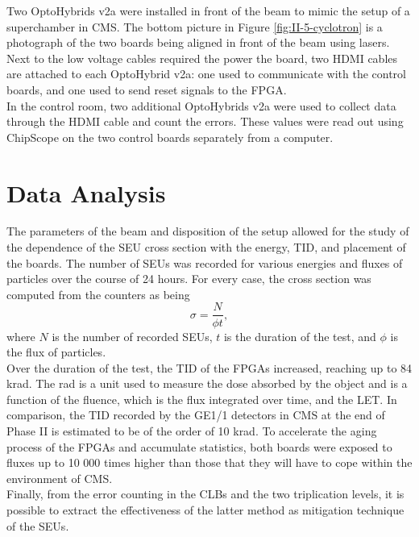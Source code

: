     Two OptoHybrids v2a were installed in front of the beam to mimic the setup of a superchamber in CMS. The bottom picture in Figure \ref{fig:II-5-cyclotron} is a photograph of the two boards being aligned in front of the beam using lasers. Next to the low voltage cables required the power the board, two HDMI cables are attached to each OptoHybrid v2a: one used to communicate with the control boards, and one used to send reset signals to the FPGA. \\

    In the control room, two additional OptoHybrids v2a were used to collect data through the HDMI cable and count the errors. These values were read out using ChipScope on the two control boards separately from a computer.

  \section{Data Analysis}

    The parameters of the beam and disposition of the setup allowed for the study of the dependence of the SEU cross section with the energy, TID, and placement of the boards. The number of SEUs was recorded for various energies and fluxes of particles over the course of 24 hours. For every case, the cross section was computed from the counters as being
    \begin{equation}
        \sigma = \frac{N}{\phi t} ,
    \end{equation}
    where $ N $ is the number of recorded SEUs, $ t $ is the duration of the test, and $ \phi $ is the flux of particles. \\

    Over the duration of the test, the TID of the FPGAs increased, reaching up to 84 krad. The rad is a unit used to measure the dose absorbed by the object and is a function of the fluence, which is the flux integrated over time, and the LET. In comparison, the TID recorded by the GE1/1 detectors in CMS at the end of Phase II is estimated to be of the order of 10 krad. To accelerate the aging process of the FPGAs and accumulate statistics, both boards were exposed to fluxes up to 10 000 times higher than those that they will have to cope within the environment of CMS. \\

    Finally, from the error counting in the CLBs and the two triplication levels, it is possible to extract the effectiveness of the latter method as mitigation technique of the SEUs.

